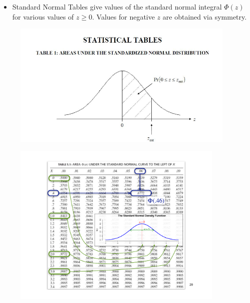 \documentclass[notes=show,smaller,handout]{beamer}\usepackage[]{graphicx}\usepackage[]{color}
\newenvironment{stepitemize}{\begin{itemize}[<+->]}{\end{itemize} }
\begin{document}
\begin{frame}{\subsecname}


\begin{stepitemize}
\item Standard Normal Tables give values of the standard normal integral $\Phi(z)$ for various values of $z\geq 0$.  Values for negative $z$ are obtained via symmetry.
\end{stepitemize}


\begin{figure}[ptb]\centering
\includegraphics[width=0.95\textwidth,height=0.75\textheight]{img/bell_curve__5.pdf}%
\end{figure}%
\end{frame}%


\begin{frame}{\subsecname}
\begin{figure}[ptb]\centering
\includegraphics[width=0.9\textwidth,height=0.95\textheight]{img/myTableGauss.pdf}%
\end{figure}%
\end{frame}%
\end{document}
